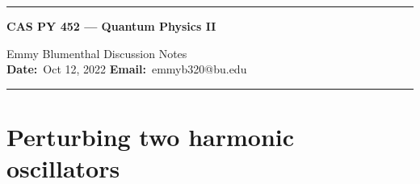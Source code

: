 \documentclass[10pt]{article}
\newcommand{\1}{\mathbf 1}
\begin{document}
\begin{center}
	\hrule
	\vspace{.4cm}
	{\textbf { \large CAS PY 452 --- Quantum Physics II}}
\end{center}
 Emmy Blumenthal \hspace{\fill} \hspace{\fill}  \textbf{} Discussion Notes\  \\
\textbf{Date:}\  Oct 12, 2022   \hspace{\fill} \textbf{Email:}\ emmyb320@bu.edu  
\vspace{.4cm}
\hrule

\section*{Perturbing two harmonic oscillators}




\end{document}
